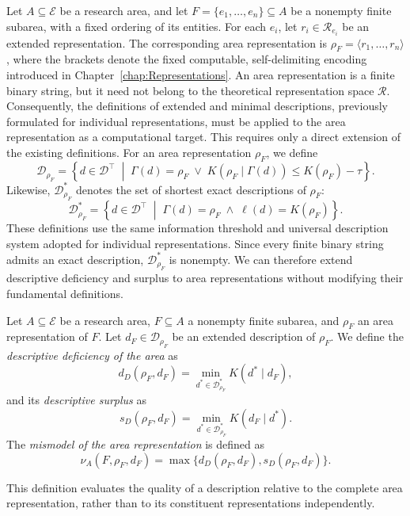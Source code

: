 Let $A\subseteq\mathcal E$ be a research area, and let $F=\{e_1,\ldots,e_n\}\subseteq A$ be a nonempty finite subarea, with a fixed ordering of its entities. For each $e_i$, let $r_i\in\mathcal R_{e_i}$ be an extended representation. The corresponding area representation is $\rho_F=\langle r_1,\ldots,r_n\rangle$, where the brackets denote the fixed computable, self-delimiting encoding introduced in Chapter~\ref{chap:Representations}. An area representation is a finite binary string, but it need not belong to the theoretical representation space $\mathcal R$. Consequently, the definitions of extended and minimal descriptions, previously formulated for individual representations, must be applied to the area representation as a computational target. This requires only a direct extension of the existing definitions. For an area representation $\rho_F$, we define
\[
\mathcal D_{\rho_F} = \left\{d\in\mathcal D^\top\;\middle|\;\Gamma(d)=\rho_F \;\lor\;
K(\rho_F\mid\Gamma(d))\leq K(\rho_F)-\tau \right\}.
\]
Likewise, $\mathcal D_{\rho_F}^\ast$ denotes the set of shortest exact descriptions of $\rho_F$:
\[
\mathcal D_{\rho_F}^\ast = \left\{d\in\mathcal D^\top\;\middle|\; \Gamma(d)=\rho_F
\;\land\; \ell(d)=K(\rho_F) \right\}.
\]
These definitions use the same information threshold and universal description system adopted for individual representations. Since every finite binary string admits an exact description, $\mathcal D_{\rho_F}^\ast$ is nonempty. We can therefore extend descriptive deficiency and surplus to area representations without modifying their fundamental definitions.

\begin{definition}
\label{def:mismodel_research_area}
Let $A\subseteq\mathcal E$ be a research area, $F\subseteq A$ a nonempty finite subarea, and $\rho_F$ an area representation of $F$. Let $d_F\in\mathcal D_{\rho_F}$ be an extended description of $\rho_F$. We define the \emph{descriptive deficiency of the area} as
\[
d_D(\rho_F,d_F) = \min_{d^\ast\in\mathcal D_{\rho_F}^\ast} K(d^\ast\mid d_F),
\]
and its \emph{descriptive surplus} as
\[
s_D(\rho_F,d_F) = \min_{d^\ast\in\mathcal D_{\rho_F}^\ast} K(d_F\mid d^\ast).
\]
The \emph{mismodel of the area representation}  is defined as
\[
\nu_A(F,\rho_F,d_F) = \max\{d_D(\rho_F,d_F),s_D(\rho_F,d_F)\}.
\]
\end{definition}

This definition evaluates the quality of a description relative to the complete area representation, rather than to its constituent representations independently.


